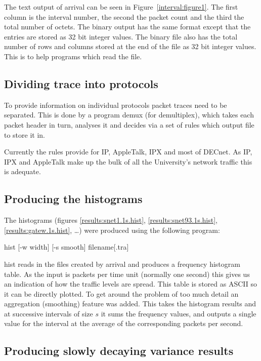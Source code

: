 The text output of {\ttfamily arrival} can be seen in
Figure~\ref{interval:figure1}.  The first column is the interval
number, the second the packet count and the third the total number of
octets.  The binary output has the same format except that the entries
are stored as 32 bit integer values.  The binary file also has the
total number of rows and columns stored at the end of the file as 32
bit integer values.  This is to help programs which read the file.

\subsection{Dividing trace into protocols}

To provide information on individual protocols packet traces need to
be separated.  This is done by a program {\ttfamily demux} (for
demultiplex), which takes each packet header in turn, analyses it and
decides via a set of rules which output file to store it in.

Currently the rules provide for IP, AppleTalk, IPX and most of DECnet.
As IP, IPX and AppleTalk make up the bulk of all the University's
network traffic this is adequate.

\subsection{Producing the histograms}

The histograms (figures \ref{results:snet1.1s.hist},
\ref{results:snet93.1s.hist}, \ref{results:gatew.1s.hist}, \ldots) were
produced using the following program:

{\ttfamily \small \begin{flushleft} hist [-w width] [-s smooth] filename[.tra]
\end{flushleft}}

{\ttfamily hist} reads in the files created by {\ttfamily arrival} and produces a
frequency histogram table.  As the input is packets per time unit
(normally one second) this gives us an indication of how the traffic
levels are spread.  This table is stored as ASCII so it can be
directly plotted.  To get around the problem of too much detail an
aggregation (smoothing) feature was added.  This takes the histogram
results and at successive intervals of size $s$ it sums the frequency
values, and outputs a single value for the interval at the average of the
corresponding packets per second.

\subsection{Producing slowly decaying variance results}
\label{results:stat}

